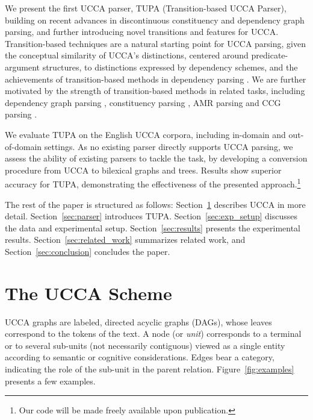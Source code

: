 \documentclass[11pt,a4paper]{article}
\newcommand{\parser}[1]{TUPA\textsubscript{#1}}
\newcommand{\secref}[1]{Section~\ref{#1}}
\newcommand{\figref}[1]{Figure~\ref{#1}}
\begin{document}
We present the first UCCA parser, \parser{}
(Transition-based UCCA Parser),
building on recent advances in discontinuous constituency
and dependency graph parsing, and further introducing novel transitions and features for UCCA.
Transition-based techniques are a natural
starting point for UCCA parsing, given the conceptual similarity of
UCCA's distinctions, centered around predicate-argument structures, to distinctions expressed
by dependency schemes, and the achievements of transition-based methods in dependency parsing
\cite{dyer2015transition,andor2016globally,kiperwasser2016simple}.
We are further motivated by the strength of transition-based methods
in related tasks, including dependency graph parsing
\cite{sagae2008shift,ribeyre-villemontedelaclergerie-seddah:2014:SemEval,tokgoz2015transition},
constituency parsing \cite{sagae2005classifier,zhang2009transition,zhu2013fast,maier2015discontinuous,maier-lichte:2016:DiscoNLP},
AMR parsing \cite{wang-xue-pradhan:2015:ACL-IJCNLP,wang2015transition,wang-EtAl:2016:SemEval,dipendra2016neural,goodman2016noise,zhou2016amr,damonte-17}
and CCG parsing \cite{zhang2011shift,ambati2015incremental,ambati-deoskar-steedman:2016:N16-1}.

We evaluate \parser{} on the English UCCA corpora, including in-domain and out-of-domain settings.
As no existing parser directly supports UCCA parsing, 
we assess the ability of existing
parsers to tackle the task, by developing a conversion procedure
from UCCA to bilexical graphs and trees.
Results show superior accuracy for \parser{}, demonstrating the effectiveness of
the presented approach.\footnote{Our code will be made freely available upon publication.}

The rest of the paper is structured as follows:
\secref{sec:ucca} describes UCCA in more detail.
\secref{sec:parser} introduces \parser{}.
\secref{sec:exp_setup} discusses the data and experimental setup.
\secref{sec:results} presents the experimental results.
\secref{sec:related_work} summarizes related work, and
\secref{sec:conclusion} concludes the paper.




\section{The UCCA Scheme}\label{sec:ucca}

UCCA graphs are labeled, directed acyclic graphs (DAGs),
whose leaves correspond to the tokens of
the text. A node (or {\it unit}) corresponds to a terminal or
to several sub-units (not necessarily contiguous) viewed as a
single entity according to semantic or cognitive considerations.
Edges bear a category, indicating the role of the sub-unit in the parent relation.
\figref{fig:examples} presents a few examples.
\end{document}
